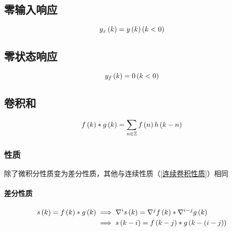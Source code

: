 \documentclass{article}
\begin{document}
\subsection{零输入响应}

\[y_x\left(k\right)=y\left(k\right)\left(k<0\right)\]

\subsection{零状态响应}

\[y_f\left(k\right)=0\left(k<0\right)\]

\subsection{卷积和}

\[f\left(k\right)\ast g\left(k\right)=\sum_{n\in\mathbb Z} f\left(n\right)h\left(k-n\right)\]

\subsubsection{性质}

除了微积分性质变为差分性质，其他与连续性质（\ref{连续卷积性质}）相同

\paragraph{差分性质}

\[\begin{aligned}
        s\left(k\right)=f\left(k\right)\ast g\left(k\right) & \implies\nabla^is\left(k\right)=\nabla^jf\left(k\right)\ast\nabla^{i-j}g\left(k\right)\\
        & \implies s\left(k-i\right)=f\left(k-j\right)\ast g\left(k-\left(i-j\right)\right)      
    \end{aligned}\]
\end{document}

